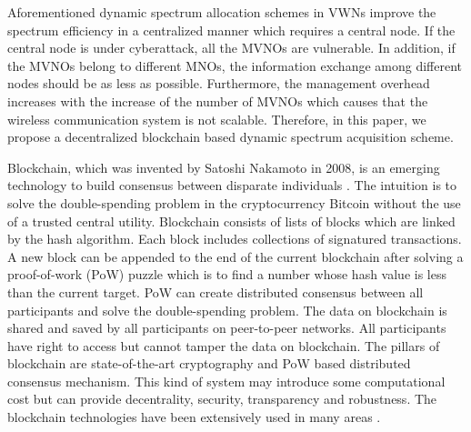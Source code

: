 \documentclass[journal]{IEEEtran}
\begin{document}
Aforementioned dynamic spectrum allocation schemes in VWNs improve the spectrum efficiency in a centralized manner which requires a central node.
If the central node is under cyberattack, all the MVNOs are vulnerable. In addition, if the MVNOs belong to different MNOs, the information exchange among different nodes should be as less as possible. Furthermore, the management overhead increases with the increase of the number of MVNOs which causes that the wireless communication system is not scalable. Therefore, in this paper, we propose a decentralized blockchain based dynamic spectrum acquisition scheme.

Blockchain, which was invented by Satoshi Nakamoto in 2008, is an emerging technology to build consensus between disparate individuals \cite{SNakamoto}. The intuition is to solve the double-spending problem in the cryptocurrency {\color{red} Bitcoin} without the use of a trusted central utility. Blockchain consists of lists of blocks which are linked by the hash algorithm. Each block includes collections of signatured transactions. A new block can be appended to the end of the current blockchain after solving a proof-of-work (PoW) puzzle which is to find a number whose hash value is less than the current target. PoW can create distributed consensus between all participants and solve the double-spending problem. The data on blockchain is shared and saved by all participants on peer-to-peer networks. All participants have right to access but cannot tamper the data on blockchain. The pillars of blockchain are state-of-the-art cryptography and PoW based distributed consensus mechanism. This kind of system may introduce some computational cost but can provide decentrality, security, transparency and robustness. The blockchain technologies have been extensively used in many areas \cite{KGai,PKSharma,ZXiong,DBRawat,Munsing,KKotobi}.
\end{document}

